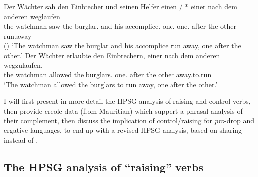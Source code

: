 \eal
\label{german2}
\ex 
\gll Der Wächter  sah den Einbrecher     und seinen Helfer            einen       / *  einer nach dem anderen weglaufen\\
     the watchman saw the burglar.\ACC{} and his    accomplice.\ACC{} one.\ACC{} {} {} one.\NOM{} after the other run.away\\\hfill()
\glt `The watchman saw the burglar and his accomplice run away, one after the other.'
\ex
\gll Der Wächter erlaubte den Einbrechern, einer nach dem anderen wegzulaufen.\\
     the watchman  allowed the burglars.\DAT{} one.\NOM{} after the other away.to.run\\
\glt `The watchman allowed the burglars to run away, one after the other.'
\zl

I will first present in more detail the HPSG analysis of raising and
control verbs, then provide creole data (from Mauritian) which support a phrasal analysis of their
complement, then discuss the implication of control/raising for \emph{pro}-drop and ergative languages, to end up
with a revised HPSG analysis, based on sharing \xarg instead of \subj. 

\subsection{The HPSG analysis of ``raising'' verbs}
\label{control:sec-HPSG-anaylsis-of-raising}

